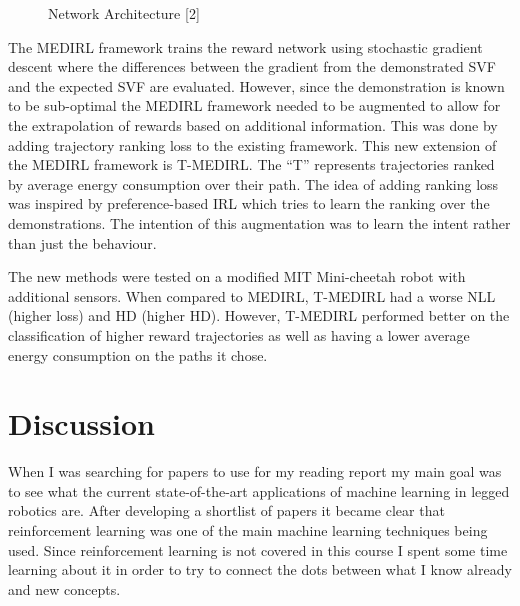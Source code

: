 \documentclass{article}
\begin{document}
\begin{figure}[H]
  \centering
  \caption{Network Architecture [2]}
\end{figure}

The MEDIRL framework trains the reward network using stochastic gradient descent where the differences between the gradient from the demonstrated SVF and the expected SVF are evaluated. However, since the demonstration is known to be sub-optimal the MEDIRL framework needed to be augmented to allow for the extrapolation of rewards based on additional information. This was done by adding trajectory ranking loss to the existing framework. This new extension of the MEDIRL framework is T-MEDIRL. The “T” represents trajectories ranked by average energy consumption over their path. The idea of adding ranking loss was inspired by preference-based IRL which tries to learn the ranking over the demonstrations. The intention of this augmentation was to learn the intent rather than just the behaviour. 

The new methods were tested on a modified MIT Mini-cheetah robot with additional sensors. When compared to MEDIRL, T-MEDIRL had a worse NLL (higher loss) and HD (higher HD). However, T-MEDIRL performed better on the classification of higher reward trajectories as well as having a lower average energy consumption on the paths it chose.

\section{Discussion}
When I was searching for papers to use for my reading report my main goal was to see what the current state-of-the-art applications of machine learning in legged robotics are. After developing a shortlist of papers it became clear that reinforcement learning was one of the main machine learning techniques being used. Since reinforcement learning is not covered in this course I spent some time learning about it in order to try to connect the dots between what I know already and new concepts.
\end{document}
